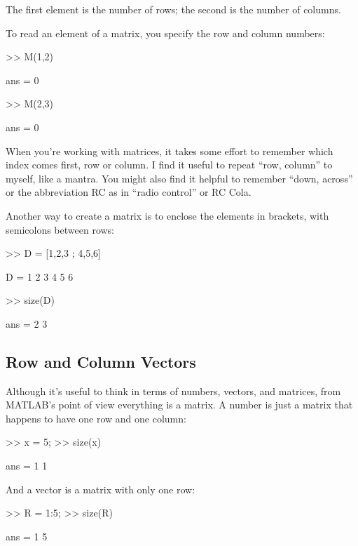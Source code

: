 The first element is the number of rows; the second is the number of
columns.


To read an element of a matrix, you specify the row and column \mbox{numbers}:

\begin{code}
>> M(1,2)

ans = 0

>> M(2,3)

ans = 0
\end{code}

When you're working with matrices, it takes some effort to remember
which index comes first, row or column.  I find it useful to repeat
``row, column'' to myself, like a mantra.  You might also find it
helpful to remember ``down, across'' or the abbreviation RC as in ``radio control'' or RC Cola.

Another way to create a matrix is to enclose the elements in
brackets, with semicolons between rows:

\begin{code}
>> D = [1,2,3 ; 4,5,6]

D =  1     2     3
     4     5     6

>> size(D)

ans = 2     3
\end{code}


\subsection{Row and Column Vectors}
\label{rowvector}


Although it's useful to think in terms of numbers, vectors, and matrices,
from MATLAB's point of view everything is a matrix.  A number
is just a matrix that happens to have one row and one column:

\begin{code}
>> x = 5;
>> size(x)

ans = 1     1
\end{code}

And a vector is a matrix with only one row:

\begin{code}
>> R = 1:5;
>> size(R)

ans = 1     5
\end{code}


